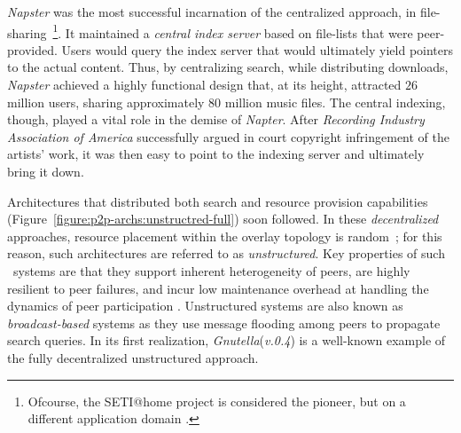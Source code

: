 {\sl Napster} was the most successful incarnation of the
centralized approach, in file-sharing~\cite{napster}\footnote{Ofcourse, the
SETI@home project is considered the pioneer, but on a different application
domain \cite{seti}.}.
It maintained a \emph{central index server} based on file-lists 
that were peer-provided.
Users would query the index server that would ultimately 
yield pointers to the actual content.
Thus, by centralizing search, while distributing downloads, {\sl Napster}
achieved a highly functional design that, at its height, attracted $26$ million
users, sharing approximately $80$ million music
files\cite{jmm_naptopusage_2001}.
The central indexing, though, played a vital role in the demise of 
{\sl Napter}. After \emph{Recording
Industry Association of America} successfully argued in court
copyright infringement of the artists' work, it was then easy to point to the
indexing server and ultimately bring it down.
%

Architectures that distributed both search and resource provision 
capabilities (Figure~\ref{figure:p2p-archs:unstructred-full}) soon followed.
In these \emph{decentralized} approaches, 
resource placement within the overlay topology is random~\cite{YG-M2002};
for this reason, such architectures are referred to as \emph{unstructured}. 
Key properties of such \p\ systems are that they
support inherent heterogeneity of peers, 
are highly resilient to peer failures,
and incur low maintenance overhead at handling 
the dynamics of peer participation \cite{stutzbach_churn_2006}. 
Unstructured systems are also known as 
\emph{broadcast-based} systems as they use message flooding among
peers to propagate search queries. 
In its first realization,
{\sl Gnutella}(\emph{v.0.4}) is a well-known example of the fully
decentralized unstructured approach.

